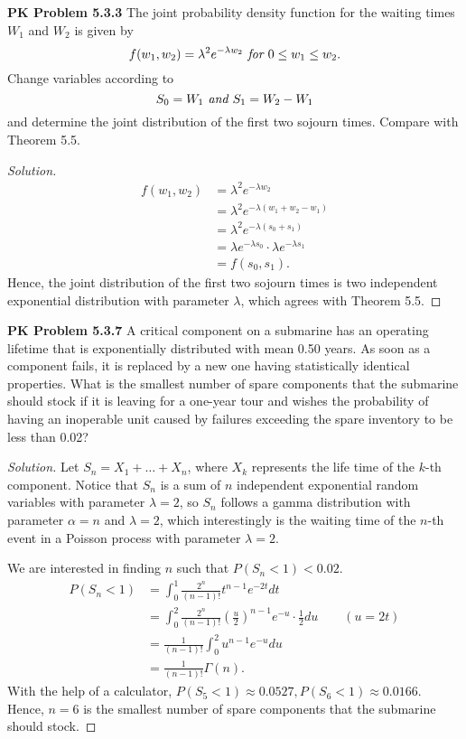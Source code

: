 \documentclass{article}
\begin{document}
\textbf{PK Problem 5.3.3}
The joint probability density function for the waiting times $W_1$ and $W_2$ is given by
$$f(w_1, w_2)=\lambda^2e^{-\lambda w_2} \emph{ for } 0 \le w_1\le w_2.$$
Change variables according to 
$$S_0 = W_1 \emph{ and } S_1 = W_2-W_1$$
and determine the joint distribution of the first two sojourn times. Compare
with Theorem 5.5.
\begin{proof}[Solution]
    \begin{align*}
        f(w_1, w_2) & = \lambda^2e^{-\lambda w_2} \\
        & = \lambda^2e^{-\lambda(w_1 + w_2 - w_1)} \\
        & = \lambda^2e^{-\lambda(s_0 + s_1)} \\
        & = \lambda e^{-\lambda s_0}\cdot \lambda e^{-\lambda s_1} \\
        & = f(s_0, s_1).
    \end{align*}
    Hence, the joint distribution of the first two sojourn times is two independent exponential distribution with parameter $\lambda$, which agrees with Theorem 5.5.
\end{proof}
\bigbreak

\textbf{PK Problem 5.3.7}
A critical component on a submarine has an operating lifetime that is 
exponentially distributed with mean 0.50 years. 
As soon as a component fails, it is replaced by a new one having 
statistically identical properties. 
What is the smallest number of spare components that the submarine 
should stock if it is leaving for a one-year tour and wishes the 
probability of having an inoperable unit caused by failures exceeding 
the spare inventory to be less than 0.02?
\begin{proof}[Solution]
    Let $S_n = X_1 + \dots + X_n$, where $X_k$ represents the life time of the $k$-th component.
    Notice that $S_n$ is a sum of $n$ independent exponential random variables with parameter $\lambda = 2$, 
    so $S_n$ follows a gamma distribution with parameter $\alpha = n$ and $\lambda = 2$, 
    which interestingly is the waiting time of the $n$-th event in a Poisson process with parameter $\lambda = 2$.

    We are interested in finding $n$ such that $P(S_n < 1) < 0.02$.
    \begin{align*}
        P(S_n < 1) & = \int_{0}^{1} \frac{2^n}{(n-1)!}t^{n-1}e^{-2t}dt \\
        & = \int_{0}^{2}\frac{2^n}{(n-1)!}\left(\frac{u}{2}\right)^{n-1}e^{-u}\cdot \frac{1}{2}du \qquad (u = 2t) \\
        & = \frac{1}{(n-1)!}\int_{0}^{2}u^{n-1}e^{-u}du \\
        & = \frac{1}{(n-1)!}\Gamma(n).
    \end{align*}
    With the help of a calculator, $P(S_5 < 1)\approx 0.0527, P(S_6 < 1)\approx 0.0166$. 
    Hence, $n = 6$ is the smallest number of spare components that the submarine should stock.
\end{proof}
\end{document}
